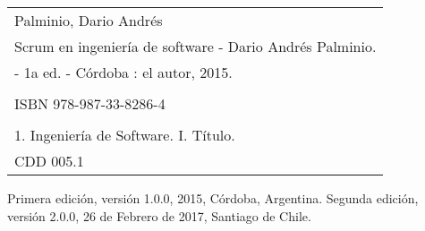 
\newpage



\begin{table}
\centering
    \begin{tabular}{|l|}
    \hline
    {\small Palminio, Dario Andrés} \\   
    {\small Scrum en ingeniería de software - Dario Andrés Palminio.} \\ 
    {\small - 1a ed. -  Córdoba : el autor, 2015.}
         \\ \\   
         {\small ISBN 978-987-33-8286-4 } \\ \\   
         {\small 1. Ingeniería de Software. I. Título.}  \\   
         {\small CDD 005.1}  \\ \hline
    \end{tabular}
\end{table}


Primera edición, versión 1.0.0, 2015, Córdoba, Argentina.
Segunda edición, versión 2.0.0, 26 de Febrero de 2017, Santiago de Chile.


